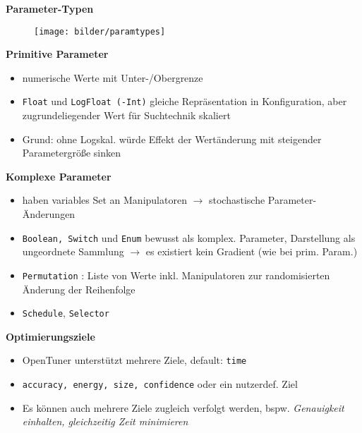   \begingroup
  \begin{frame}
    \textbf{Parameter-Typen}
    \begin{figure}[ht]
      \centering	      
      \texttt{[image: bilder/paramtypes]}
      \label{paramtypes}
    \end{figure}
    
  \textbf{Primitive Parameter}
  \begin{itemize}
    \item numerische Werte mit Unter-/Obergrenze
    \item \texttt{Float} und \texttt{LogFloat (-Int)} gleiche Repräsentation in Konfiguration, aber 
    zugrundeliegender Wert für Suchtechnik skaliert
    \item Grund: ohne Logskal. würde Effekt der Wertänderung mit steigender Parametergröße sinken
    
  \end{itemize}
  \end{frame}
  \endgroup
  
  \begingroup
  \begin{frame}
    \textbf{Komplexe Parameter}
    \begin{itemize}
      \item haben variables Set an Manipulatoren $\rightarrow$ stochastische Parameter-Änderungen
      \item \texttt{Boolean, Switch} und \texttt{Enum} bewusst als komplex. Parameter, Darstellung
      als ungeordnete Sammlung $\rightarrow$ es existiert kein Gradient (wie bei prim. Param.)
      \item \texttt{Permutation} : Liste von Werte inkl. Manipulatoren zur randomisierten Änderung der Reihenfolge
      \item \texttt{Schedule}, \texttt{Selector}
      
    \end{itemize}
  
  \textbf{Optimierungsziele}
    \begin{itemize}
      \item OpenTuner unterstützt mehrere Ziele, default: \texttt{time}
      \item \texttt{accuracy, energy, size, confidence} oder ein nutzerdef. Ziel
      \item Es können auch mehrere Ziele zugleich verfolgt werden, bspw. \emph{Genauigkeit einhalten, gleichzeitig
      Zeit minimieren}
    \end{itemize}
  \end{frame}
  \endgroup
    
